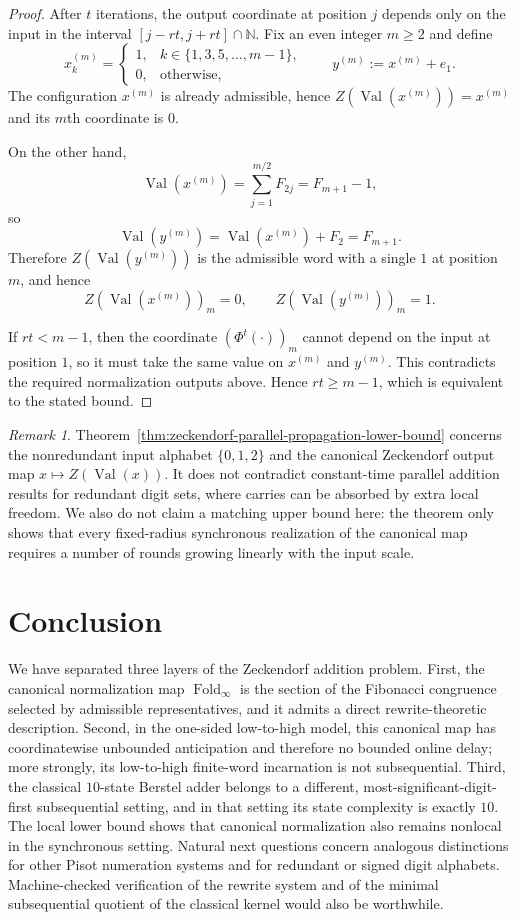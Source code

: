 \documentclass[11pt,letterpaper]{article}
\numberwithin{equation}{section}
\theoremstyle{plain}
\theoremstyle{definition}
\theoremstyle{remark}
\newtheorem{remark}[theorem]{Remark}
\newcommand{\NN}{\mathbb{N}}
\DeclareMathOperator{\Val}{Val}
\DeclareMathOperator{\Fold}{Fold}
\begin{document}
\begin{proof}
After $t$ iterations, the output coordinate at position $j$ depends only on
the input in the interval $[j-rt,j+rt]\cap\NN$.
Fix an even integer $m\ge 2$ and define
\[
x^{(m)}_k=
\begin{cases}
1,&k\in\{1,3,5,\dots,m-1\},\\
0,&\text{otherwise},
\end{cases}
\qquad
y^{(m)}:=x^{(m)}+e_1.
\]
The configuration $x^{(m)}$ is already admissible, hence
$Z(\Val(x^{(m)}))=x^{(m)}$ and its $m$th coordinate is $0$.

On the other hand,
\[
\Val(x^{(m)})
=
\sum_{j=1}^{m/2}F_{2j}
=
F_{m+1}-1,
\]
so
\[
\Val(y^{(m)})=\Val(x^{(m)})+F_2=F_{m+1}.
\]
Therefore $Z(\Val(y^{(m)}))$ is the admissible word with a single $1$ at
position $m$, and hence
\[
Z(\Val(x^{(m)}))_m=0,
\qquad
Z(\Val(y^{(m)}))_m=1.
\]

If $rt<m-1$, then the coordinate $(\Phi^t(\cdot))_m$ cannot depend on the input
at position $1$, so it must take the same value on $x^{(m)}$ and $y^{(m)}$.
This contradicts the required normalization outputs above.  Hence
$rt\ge m-1$, which is equivalent to the stated bound.
\end{proof}

\begin{remark}
Theorem~\ref{thm:zeckendorf-parallel-propagation-lower-bound} concerns the
nonredundant input alphabet $\{0,1,2\}$ and the canonical Zeckendorf output
map $x\mapsto Z(\Val(x))$.  It does not contradict constant-time parallel
addition results for redundant digit sets, where carries can be absorbed by
extra local freedom.  We also do not claim a matching upper bound here:
the theorem only shows that every fixed-radius synchronous realization of the
canonical map requires a number of rounds growing linearly with the input
scale.
\end{remark}

\section{Conclusion}

We have separated three layers of the Zeckendorf addition problem.  First, the
canonical normalization map $\Fold_\infty$ is the section of the Fibonacci
congruence selected by admissible representatives, and it admits a direct
rewrite-theoretic description.  Second, in the one-sided low-to-high model,
this canonical map has coordinatewise unbounded anticipation and therefore no
bounded online delay; more strongly, its low-to-high finite-word incarnation
is not subsequential.  Third, the classical $10$-state Berstel adder belongs
to a different, most-significant-digit-first subsequential setting, and in
that setting its state complexity is exactly $10$.  The local lower bound
shows that canonical normalization also remains nonlocal in the synchronous
setting.  Natural next questions concern analogous distinctions for other
Pisot numeration systems and for redundant or signed digit alphabets.
Machine-checked verification of the rewrite system and of the minimal
subsequential quotient of the classical kernel would also be worthwhile.
\end{document}
